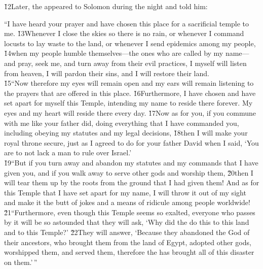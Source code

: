 \v{12}Later, the  appeared to Solomon during the night and told him:

\begin{poetry}
\poeml ``I have heard your prayer and have chosen this place for a sacrificial temple to me. \v{13}Whenever I close the skies so there is no rain, or whenever I command locusts to lay waste to the land, or whenever I send epidemics among my people, \v{14}when my people humble themselves---the ones who are called by my name---and pray, seek me, and turn away from their evil practices, I myself will listen from heaven, I will pardon their sins, and I will restore their land. \\
\poeml \v{15}``Now therefore my eyes will remain open and my ears will remain listening to the prayers that are offered in this place. \v{16}Furthermore, I have chosen and have set apart for myself this Temple, intending my name to reside there forever. My eyes and my heart will reside there every day. \v{17}Now as for you, if you commune with me like your father did, doing everything that I have commanded you, including obeying my statutes and my legal decisions, \v{18}then I will make your royal throne secure, just as I agreed to do for your father David when I said, `You are to not lack a man to rule over Israel.' \\
\poeml \v{19}``But if you turn away and abandon my statutes and my commands that I have given you, and if you walk away to serve other gods and worship them, \v{20}then I will tear them up by the roots from the ground that I had given them! And as for this Temple that I have set apart for my name, I will throw it out of my sight and make it the butt of jokes and a means of ridicule among people worldwide! \\
\poeml \v{21}``Furthermore, even though this Temple seems so exalted, everyone who passes by it will be so astounded that they will ask, `Why did the  do this to this land and to this Temple?' \v{22}They will answer, `Because they abandoned the  God of their ancestors, who brought them from the land of Egypt, adopted other gods, worshipped them, and served them, therefore the  has brought all of this disaster on them.'\,''
\end{poetry}


